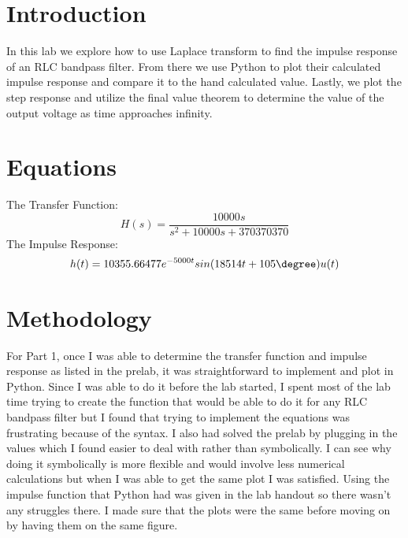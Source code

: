 \documentclass[12pt]{report}
\begin{document}
\section{Introduction}
 

In this lab we explore how to use Laplace transform to find the impulse response of an RLC bandpass filter. From there we use Python to plot their calculated impulse response and compare it to the hand calculated value. Lastly, we plot the step response and utilize the final value theorem to determine the value of the output voltage as time approaches infinity. 

\section{Equations}

The Transfer Function:
\begin{equation*}
H(s) = \frac{10000s}{s^2 + 10000s +370370370}
\end{equation*}
The Impulse Response:
\begin{equation*}
h(t) = 10355.66477e^{-5000t}sin(18514t+105\degree)u(t)
\end{equation*}



\section{Methodology}

For Part 1, once I was able to determine the transfer function and impulse response as listed in the prelab, it was straightforward to implement and plot in Python. Since I was able to do it before the lab started, I spent most of the lab time trying to create the function that would be able to do it for any RLC bandpass filter but I found that trying to implement the equations was frustrating because of the syntax. I also had solved the prelab by plugging in the values which I found easier to deal with rather than symbolically. I can see why doing it symbolically is more flexible and would involve less numerical calculations but when I was able to get the same plot I was satisfied. Using the impulse function that Python had was given in the lab handout so there wasn't any struggles there. I made sure that the plots were the same before moving on by having them on the same figure. 
\end{document}
